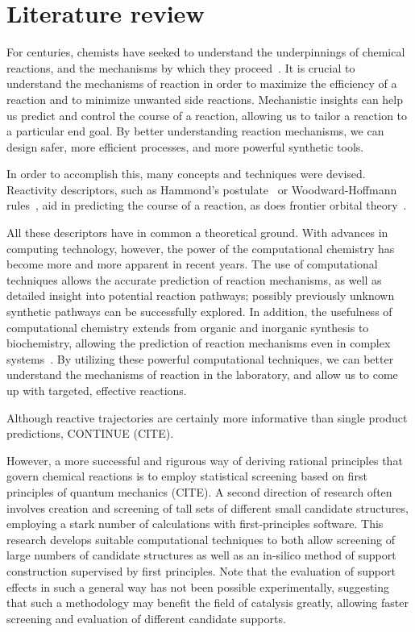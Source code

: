 \chapter{Literature review}%
\label{ch:lit-review}

For centuries, chemists have seeked to understand the underpinnings of chemical reactions,
and the mechanisms by which they proceed~\cite{Armstrong_1887}.
It is crucial to understand the mechanisms of reaction in order to maximize the efficiency of a reaction
and to minimize unwanted side reactions.
Mechanistic insights can help us predict and control the course of a reaction, allowing us to tailor a reaction to a particular end goal.
By better understanding reaction mechanisms, we can design safer, more efficient processes, and more powerful synthetic tools.

In order to accomplish this, many concepts and techniques were devised.
Reactivity descriptors, such as
Hammond's postulate~\cite{Hammond_1955,Cremer_2012,HammondPrinciple} or
Woodward-Hoffmann rules~\cite{Havinga_1961,Woodward_1965,Dewar_1966,Zimmerman_1966,Woodward_1969,Nobel_1981},
aid in predicting the course of a reaction, as does frontier orbital theory~\cite{Fukui_1952,Brown_2013}.

All these descriptors have in common a theoretical ground.
With advances in computing technology, however, the power of the computational chemistry has become more and more apparent in recent years.
The use of computational techniques allows the accurate prediction of reaction mechanisms,
as well as detailed insight into potential reaction pathways;
possibly previously unknown synthetic pathways can be successfully explored.
In addition, the usefulness of computational chemistry extends from organic and inorganic synthesis to biochemistry,
allowing the prediction of reaction mechanisms even in complex systems~\cite{Klippenstein_2014}.
By utilizing these powerful computational techniques, we can better understand the mechanisms of reaction in the laboratory,
and allow us to come up with targeted, effective reactions.

Although reactive trajectories are certainly more informative than single product predictions,
CONTINUE (CITE).

However, a more successful and rigurous way of deriving rational principles that govern
chemical reactions is to employ statistical screening based on first principles
of quantum mechanics (CITE).
A second direction of research often involves creation and screening of
tall sets of different small candidate structures,
employing a stark number of calculations with first-principles software.
This research develops suitable computational techniques
to both allow screening of large numbers of candidate structures as well as
an in-silico method of support construction supervised by first principles.
Note that the evaluation of support effects in such a general way
has not been possible experimentally,
suggesting that such a methodology may benefit the field of catalysis greatly,
allowing faster screening and evaluation of
different candidate supports.

